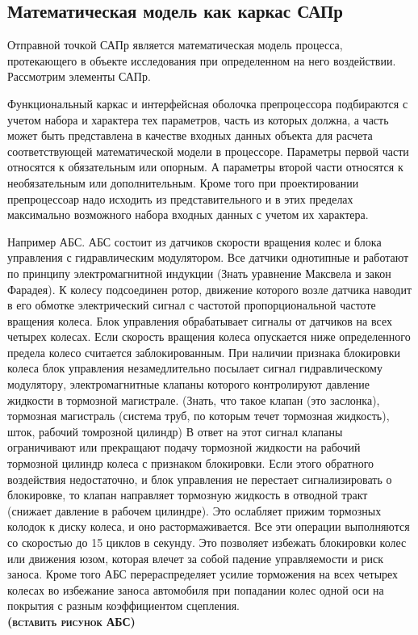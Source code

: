 \subsection{Математическая модель как каркас САПр}
Отправной точкой САПр является математическая модель процесса, протекающего в
объекте исследования при определенном на него воздействии. Рассмотрим элементы 
САПр.\par
Функциональный каркас и интерфейсная оболочка препроцессора подбираются с 
учетом набора и характера тех параметров, часть из которых должна, а часть 
может быть представлена в качестве входных данных объекта для расчета
соответствующей математической модели в процессоре. Параметры первой части
относятся к обязательным или опорным. А параметры второй части относятся к
необязательным или дополнительным. Кроме того при проектировании препроцессоар
надо исходить из представительного и в этих пределах максимально возможного
набора входных данных с учетом их характера.\par
Например АБС. АБС состоит из датчиков скорости вращения колес и блока управления
с гидравлическим модулятором. Все датчики однотипные и работают по принципу
электромагнитной индукции {\ttfamily (Знать уравнение Максвела и закон
Фарадея)}. К колесу подсоединен ротор, движение которого возле датчика наводит в
его обмотке электрический сигнал с частотой пропорциональной частоте вращения
колеса. Блок управления обрабатывает сигналы от датчиков на всех четырех
колесах. Если скорость вращения колеса опускается ниже определенного предела
колесо считается заблокированным. При наличии признака блокировки колеса блок
управления незамедлительно посылает сигнал гидравлическому модулятору,
электромагнитные клапаны которого контролируют давление жидкости в тормозной
магистрале. {\ttfamily (Знать, что такое клапан (это заслонка), тормозная
магистраль (система труб, по которым течет тормозная жидкость), шток, рабочий томрозной
цилиндр)} В ответ на этот сигнал клапаны ограничивают или прекращают подачу 
тормозной жидкости на рабочий тормозной цилиндр колеса с признаком блокировки.
Если этого обратного воздействия недостаточно, и блок управления не перестает
сигнализировать о блокировке, то клапан направляет тормозную жидкость в отводной
тракт (снижает давление в рабочем цилиндре). Это ослабляет прижим тормозных
колодок к диску колеса, и оно растормаживается. Все эти операции выполняются со
скоростью до 15 циклов в секунду. Это позволяет избежать блокировки колес или
движения юзом, которая влечет за собой падение управляемости и риск заноса.
Кроме того АБС перераспределяет усилие торможения на всех четырех колесах во
избежание заноса автомобиля при попадании колес одной оси на покрытия с разным
коэффициентом сцепления.
\\\textsc{\bfseries(вставить рисунок АБС)}

